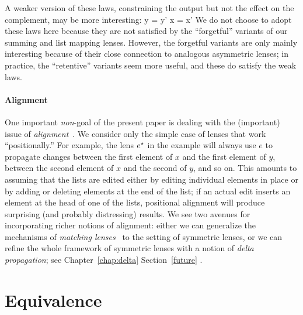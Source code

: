 \iffull
A weaker version of these laws, constraining the output but not the effect
on the complement, may be more interesting:
%
{
  {y = y'}
  {x = x'}
}
%
  We do not choose to adopt these laws here because they are not satisfied
  by the ``forgetful'' variants of our summing and list mapping lenses.
  However, the forgetful variants are only mainly interesting because of
  their close connection to analogous asymmetric lenses; in practice, the
  ``retentive'' variants seem more useful, and these do satisfy the weak
   laws.  
\fi %

\paragraph*{Alignment}\label{firstalign}

One important {\em non}-goal of the present paper is dealing with the
(important) 
issue of {\em alignment}~\cite{Boomerang07,Matching10}.  We consider 
only the simple case of lenses 
that work ``positionally.''  For example, the lens $e^\star$ in the example
will always use $e$ to propagate
changes between the first element of $x$ and the first element of $y$,
between the second element of $x$ and the second of $y$, and so on.  This
amounts to assuming that the lists are edited either by editing individual
elements in place or by adding or deleting elements at the end of the list;
if an actual edit inserts an element at the head of one of the lists,
positional alignment will produce surprising (and probably distressing)
results.  We see two avenues for incorporating richer notions of alignment:
either we can generalize the mechanisms of {\em matching
  lenses}~\cite{Matching10} to the setting of symmetric lenses, or we can
refine the whole framework of symmetric lenses with a notion of {\em delta
propagation}; see
\ifdissertation Chapter~\ref{chap:delta}%
\else Section~\ref{future}%
\fi.

\section{Equivalence}\label{equiv}

